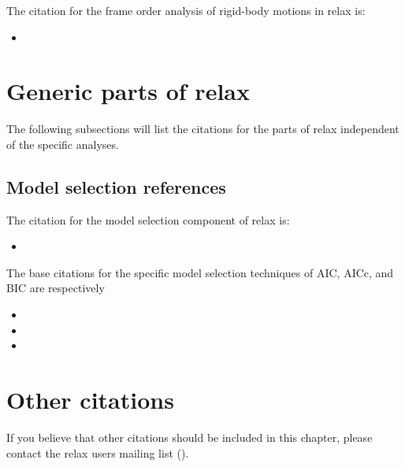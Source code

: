 The citation for the frame order analysis of rigid-body motions in relax is:
\begin{itemize}
  \item {}
\end{itemize}




\section*{Generic parts of relax}

The following subsections will list the citations for the parts of relax independent of the specific analyses.



\subsection*{Model selection references}

The citation for the model selection component of relax is:
\begin{itemize}
  \item {}
\end{itemize}

The base citations for the specific model selection techniques of AIC, AICc, and BIC are respectively \citet{Akaike73,HurvichTsai89,Schwarz78}
\begin{itemize}
  \item {}
  \item {}
  \item {}
\end{itemize}




\section*{Other citations}

If you believe that other citations should be included in this chapter, please contact the relax users mailing list (\relaxUsersML{}).
